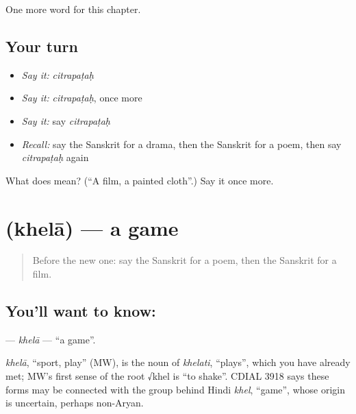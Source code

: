 \begin{grammarlens}[title={What you've built}]
One more word for this chapter.
\end{grammarlens}

\subsection*{Your turn}
\begin{itemize}
\raggedright
  \item \emph{Say it:} \emph{citrapaṭaḥ}
  \item \emph{Say it:} \emph{citrapaṭaḥ}, once more
  \item \emph{Say it:} say \emph{citrapaṭaḥ}
  \item \emph{Recall:} say the Sanskrit for a drama, then the Sanskrit for a poem, then say \emph{citrapaṭaḥ} again
\end{itemize}

\begin{tcolorbox}[breakable,colback=teal!4,colframe=teal!35!black,title={Before you move on}]
What does  mean? (\textquotedblleft{}A film, a painted cloth\textquotedblright{}.) Say it once more.
\end{tcolorbox}
\section[\texorpdfstring{\sk{खेला} (khelā)}{खेला (khelā)}]{ (khelā) — a game}

\label{lesson:SA-C249-khela}



\begin{quote}
Before the new one: say the Sanskrit for a poem, then the Sanskrit for a film.
\end{quote}

\subsection*{You'll want to know: }
\textbf{} — \emph{khelā} — \textquotedblleft{}a game\textquotedblright{}.

\begin{cousinweb}
\emph{khelā}, \textquotedblleft{}sport, play\textquotedblright{} (MW), is the noun of \emph{khelati}, \textquotedblleft{}plays\textquotedblright{}, which you have already met; MW's first sense of the root √khel is \textquotedblleft{}to shake\textquotedblright{}. CDIAL 3918 says these forms may be connected with the group behind Hindi \emph{khel}, \textquotedblleft{}game\textquotedblright{}, whose origin is uncertain, perhaps non-Aryan.
\end{cousinweb}

